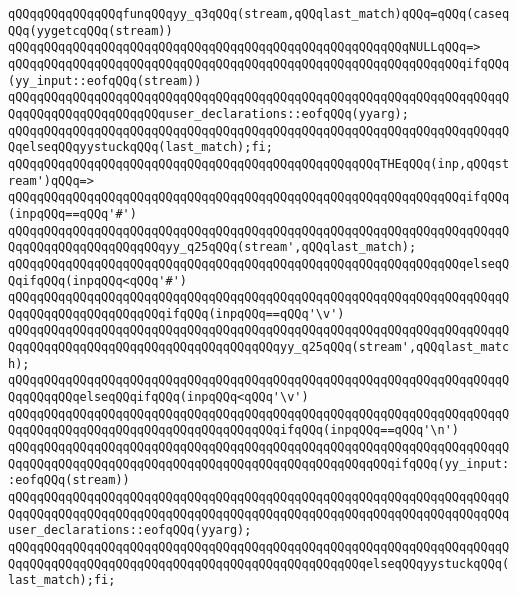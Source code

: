 \verb|qQQqqQQqqQQqqQQqfunqQQqyy_q3qQQq(stream,qQQqlast_match)qQQq=qQQq(caseqQQq(yygetcqQQq(stream))|\newline
\verb|qQQqqQQqqQQqqQQqqQQqqQQqqQQqqQQqqQQqqQQqqQQqqQQqqQQqqQQqNULLqQQq=>|\newline
\verb|qQQqqQQqqQQqqQQqqQQqqQQqqQQqqQQqqQQqqQQqqQQqqQQqqQQqqQQqqQQqqQQqifqQQq(yy_input::eofqQQq(stream))|\newline
\verb|qQQqqQQqqQQqqQQqqQQqqQQqqQQqqQQqqQQqqQQqqQQqqQQqqQQqqQQqqQQqqQQqqQQqqQQqqQQqqQQqqQQqqQQqqQQquser_declarations::eofqQQq(yyarg);|\newline
\verb|qQQqqQQqqQQqqQQqqQQqqQQqqQQqqQQqqQQqqQQqqQQqqQQqqQQqqQQqqQQqqQQqqQQqqQQqelseqQQqyystuckqQQq(last_match);fi;|\newline
\verb|qQQqqQQqqQQqqQQqqQQqqQQqqQQqqQQqqQQqqQQqqQQqqQQqqQQqTHEqQQq(inp,qQQqstream')qQQq=>|\newline
\verb|qQQqqQQqqQQqqQQqqQQqqQQqqQQqqQQqqQQqqQQqqQQqqQQqqQQqqQQqqQQqqQQqifqQQq(inpqQQq==qQQq'#')|\newline
\verb|qQQqqQQqqQQqqQQqqQQqqQQqqQQqqQQqqQQqqQQqqQQqqQQqqQQqqQQqqQQqqQQqqQQqqQQqqQQqqQQqqQQqqQQqqQQqyy_q25qQQq(stream',qQQqlast_match);|\newline
\verb|qQQqqQQqqQQqqQQqqQQqqQQqqQQqqQQqqQQqqQQqqQQqqQQqqQQqqQQqqQQqqQQqelseqQQqifqQQq(inpqQQq<qQQq'#')|\newline
\verb|qQQqqQQqqQQqqQQqqQQqqQQqqQQqqQQqqQQqqQQqqQQqqQQqqQQqqQQqqQQqqQQqqQQqqQQqqQQqqQQqqQQqqQQqqQQqifqQQq(inpqQQq==qQQq'\v')|\newline
\verb|qQQqqQQqqQQqqQQqqQQqqQQqqQQqqQQqqQQqqQQqqQQqqQQqqQQqqQQqqQQqqQQqqQQqqQQqqQQqqQQqqQQqqQQqqQQqqQQqqQQqqQQqqQQqyy_q25qQQq(stream',qQQqlast_match);|\newline
\verb|qQQqqQQqqQQqqQQqqQQqqQQqqQQqqQQqqQQqqQQqqQQqqQQqqQQqqQQqqQQqqQQqqQQqqQQqqQQqqQQqelseqQQqifqQQq(inpqQQq<qQQq'\v')|\newline
\verb|qQQqqQQqqQQqqQQqqQQqqQQqqQQqqQQqqQQqqQQqqQQqqQQqqQQqqQQqqQQqqQQqqQQqqQQqqQQqqQQqqQQqqQQqqQQqqQQqqQQqqQQqqQQqifqQQq(inpqQQq==qQQq'\n')|\newline
\verb|qQQqqQQqqQQqqQQqqQQqqQQqqQQqqQQqqQQqqQQqqQQqqQQqqQQqqQQqqQQqqQQqqQQqqQQqqQQqqQQqqQQqqQQqqQQqqQQqqQQqqQQqqQQqqQQqqQQqqQQqqQQqifqQQq(yy_input::eofqQQq(stream))|\newline
\verb|qQQqqQQqqQQqqQQqqQQqqQQqqQQqqQQqqQQqqQQqqQQqqQQqqQQqqQQqqQQqqQQqqQQqqQQqqQQqqQQqqQQqqQQqqQQqqQQqqQQqqQQqqQQqqQQqqQQqqQQqqQQqqQQqqQQqqQQqqQQquser_declarations::eofqQQq(yyarg);|\newline
\verb|qQQqqQQqqQQqqQQqqQQqqQQqqQQqqQQqqQQqqQQqqQQqqQQqqQQqqQQqqQQqqQQqqQQqqQQqqQQqqQQqqQQqqQQqqQQqqQQqqQQqqQQqqQQqqQQqqQQqqQQqelseqQQqyystuckqQQq(last_match);fi;|\newline
